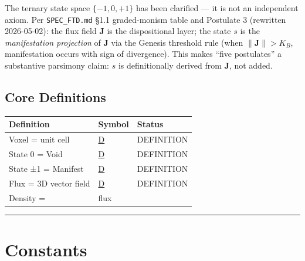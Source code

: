 \documentclass[
  11pt,
  letterpaper,
  twoside,
  openany]{book}
\makeatletter
\let\orig@section\section
\renewcommand{\section}{\needspace{8\baselineskip}\orig@section}
\let\orig@subsection\subsection
\renewcommand{\subsection}{\needspace{6\baselineskip}\orig@subsection}
\makeatother
\begin{document}
\begin{tcolorbox}[enhanced jigsaw, colbacktitle=quarto-callout-note-color!10!white, titlerule=0mm, bottomtitle=1mm, bottomrule=.15mm, colback=white, arc=.35mm, breakable, toprule=.15mm, title=\textcolor{quarto-callout-note-color}{\faInfo}\hspace{0.5em}{Ternary States: J-primary, \(s\) as manifestation projection
(post-2026-05-02 MC-T4.1 reframe)}, rightrule=.15mm, coltitle=black, leftrule=.75mm, colframe=quarto-callout-note-color-frame, toptitle=1mm, opacityback=0, opacitybacktitle=0.6, left=2mm]

The ternary state space \(\{-1, 0, +1\}\) has been clarified --- it is
not an independent axiom. Per \texttt{SPEC\_FTD.md} §1.1 graded-monism
table and Postulate 3 (rewritten 2026-05-02): the flux field
\(\mathbf{J}\) is the dispositional layer; the state \(s\) is the
\emph{manifestation projection} of \(\mathbf{J}\) via the Genesis
threshold rule (when \(\|\mathbf{J}\| > K_B\), manifestation occurs with
sign of divergence). This makes ``five postulates'' a substantive
parsimony claim: \(s\) is definitionally derived from \(\mathbf{J}\),
not added.

\end{tcolorbox}

\subsection{Core Definitions}\label{core-definitions}

\begin{longtable}[]{@{}lll@{}}
\toprule\noalign{}
Definition & Symbol & Status \\
\midrule\noalign{}
\endhead
\bottomrule\noalign{}
\endlastfoot
Voxel = unit cell & \hyperref[d]{D} & DEFINITION \\
State 0 = Void & \hyperref[d]{D} & DEFINITION \\
State ±1 = Manifest & \hyperref[d]{D} & DEFINITION \\
Flux = 3D vector field & \hyperref[d]{D} & DEFINITION \\
Density = & flux & \\
\end{longtable}

\begin{center}\rule{0.5\linewidth}{0.5pt}\end{center}

\section{Constants}\label{constants}
\end{document}
